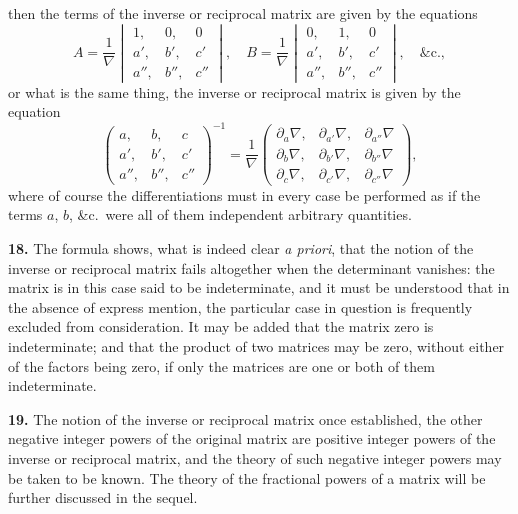 \documentclass[11pt,a4paper]{book}
\begin{document}
\begin{center}
\[\]
then the terms of the inverse or reciprocal matrix are given by the equations
\[
A = \frac{1}{\nabla}\begin{vmatrix} 1, & 0, & 0 \\ a', & b', & c' \\ a'', & b'', & c'' \end{vmatrix},\quad
B = \frac{1}{\nabla}\begin{vmatrix} 0, & 1, & 0 \\ a', & b', & c' \\ a'', & b'', & c'' \end{vmatrix},\quad \&\text{c.},
\]
or what is the same thing, the inverse or reciprocal matrix is given by the equation
\[
\begin{pmatrix} a, & b, & c \\ a', & b', & c' \\ a'', & b'', & c'' \end{pmatrix}^{-1}
= \frac{1}{\nabla}
\begin{pmatrix}
\partial_a \nabla, & \partial_{a'} \nabla, & \partial_{a''} \nabla \\
\partial_b \nabla, & \partial_{b'} \nabla, & \partial_{b''} \nabla \\
\partial_c \nabla, & \partial_{c'} \nabla, & \partial_{c''} \nabla
\end{pmatrix},
\]
where of course the differentiations must in every case be performed as if the terms $a$, $b$, \&c.\ were all of them independent arbitrary quantities.

\newpage

\medskip
\noindent\textbf{18.} The formula shows, what is indeed clear \textit{a priori}, that the notion of the inverse or reciprocal matrix fails altogether when the determinant vanishes: the matrix is in this case said to be indeterminate, and it must be understood that in the absence of express mention, the particular case in question is frequently excluded from consideration. It may be added that the matrix zero is indeterminate; and that the product of two matrices may be zero, without either of the factors being zero, if only the matrices are one or both of them indeterminate.

\medskip
\noindent\textbf{19.} The notion of the inverse or reciprocal matrix once established, the other negative integer powers of the original matrix are positive integer powers of the inverse or reciprocal matrix, and the theory of such negative integer powers may be taken to be known. The theory of the fractional powers of a matrix will be further discussed in the sequel.


\end{center}
\end{document}

